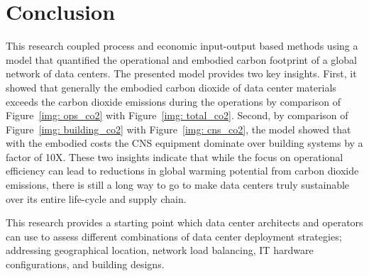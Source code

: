     
\section{Conclusion}

This research coupled process and economic input-output based methods using a model that quantified the operational and embodied carbon footprint of a global network of data centers.  The presented model provides two key insights. First, it showed that generally the embodied carbon dioxide of data center materials exceeds the carbon dioxide emissions during the operations by comparison of Figure~\ref{img: ops_co2} with Figure~\ref{img: total_co2}. Second, by comparison of Figure~\ref{img: building_co2} with Figure~\ref{img: cns_co2}, the model showed that with the embodied costs the CNS equipment dominate over building systems by a factor of 10X. These two insights indicate that while the focus on operational efficiency can lead to reductions in global warming potential from carbon dioxide emissions, there is still a long way to go to make data centers truly sustainable over its entire life-cycle and supply chain. 

This research provides a starting point which data center architects and operators can use to assess different combinations of data center deployment strategies; addressing geographical location, network load balancing, IT hardware configurations, and building designs.



        